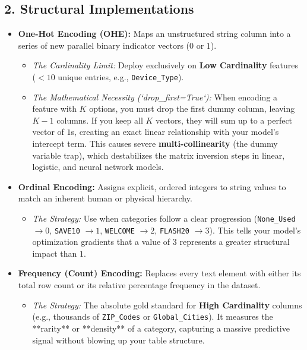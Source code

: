 \documentclass[12pt,a4paper]{article}
\begin{document}
\subsection*{2. Structural Implementations}
\begin{itemize}
    \item \textbf{One-Hot Encoding (OHE):} Maps an unstructured string column into a series of new parallel binary indicator vectors ($0$ or $1$).
    \begin{itemize}
        \item \textit{The Cardinality Limit:} Deploy exclusively on \textbf{Low Cardinality} features ($< 10$ unique entries, e.g., \texttt{Device\_Type}).
        \item \textit{The Mathematical Necessity (`drop\_first=True`):} When encoding a feature with $K$ options, you must drop the first dummy column, leaving $K-1$ columns. If you keep all $K$ vectors, they will sum up to a perfect vector of $1$s, creating an exact linear relationship with your model's intercept term. This causes severe \textbf{multi-collinearity} (the dummy variable trap), which destabilizes the matrix inversion steps in linear, logistic, and neural network models.
    \end{itemize}
    \item \textbf{Ordinal Encoding:} Assigns explicit, ordered integers to string values to match an inherent human or physical hierarchy.
    \begin{itemize}
        \item \textit{The Strategy:} Use when categories follow a clear progression (\texttt{None\_Used} $\to 0$, \texttt{SAVE10} $\to 1$, \texttt{WELCOME} $\to 2$, \texttt{FLASH20} $\to 3$). This tells your model's optimization gradients that a value of $3$ represents a greater structural impact than $1$.
    \end{itemize}
    \item \textbf{Frequency (Count) Encoding:} Replaces every text element with either its total row count or its relative percentage frequency in the dataset.
    \begin{itemize}
        \item \textit{The Strategy:} The absolute gold standard for \textbf{High Cardinality} columns (e.g., thousands of \texttt{ZIP\_Codes} or \texttt{Global\_Cities}). It measures the **rarity** or **density** of a category, capturing a massive predictive signal without blowing up your table structure.
    \end{itemize}
\end{itemize}
\end{document}
